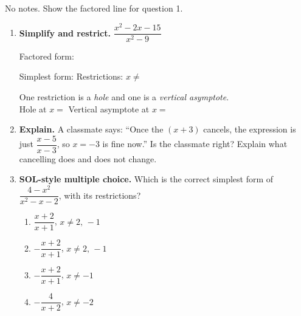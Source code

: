 \documentclass[10pt]{article}
\begin{document}
\namedateperiod

\vspace{0.08in}

No notes. Show the factored line for question 1.

\vspace{0.06in}

\begin{enumerate}[leftmargin=1.8em, itemsep=9pt]
  \item \textbf{Simplify and restrict.} \; $\dfrac{x^2-2x-15}{x^2-9}$

        \vspace{4pt}
        Factored form: \blank{5.0cm}

        \vspace{4pt}
        Simplest form: \blank{2.6cm} \quad Restrictions: $x\neq$ \blank{2.4cm}

        \vspace{4pt}
        One restriction is a \emph{hole} and one is a \emph{vertical asymptote}. \\[3pt]
        Hole at $x=$ \blank{1.2cm} \quad Vertical asymptote at $x=$ \blank{1.2cm}

  \item \textbf{Explain.} A classmate says: ``Once the $(x+3)$ cancels, the expression is just
        $\dfrac{x-5}{x-3}$, so $x=-3$ is fine now.'' Is the classmate right? Explain what cancelling
        does and does not change.

  \item \textbf{SOL-style multiple choice.} Which is the correct simplest form of
        $\dfrac{4-x^2}{x^2-x-2}$, with its restrictions?
        \begin{enumerate}[label=\Alph*., leftmargin=1.9em, itemsep=1pt]
          \item $\dfrac{x+2}{x+1}$, \; $x\neq2,\,-1$
          \item $-\dfrac{x+2}{x+1}$, \; $x\neq2,\,-1$
          \item $-\dfrac{x+2}{x+1}$, \; $x\neq-1$
          \item $-\dfrac{4}{x+2}$, \; $x\neq-2$
        \end{enumerate}
\end{enumerate}
\end{document}
